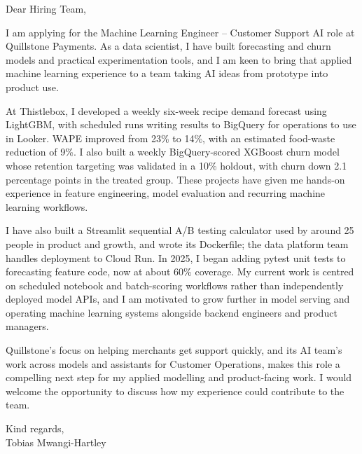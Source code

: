 \documentclass[11pt,a4paper]{article}
\begin{document}
Dear Hiring Team,

I am applying for the Machine Learning Engineer -- Customer Support AI role at Quillstone Payments. As a data scientist, I have built forecasting and churn models and practical experimentation tools, and I am keen to bring that applied machine learning experience to a team taking AI ideas from prototype into product use.

At Thistlebox, I developed a weekly six-week recipe demand forecast using LightGBM, with scheduled runs writing results to BigQuery for operations to use in Looker. WAPE improved from 23\% to 14\%, with an estimated food-waste reduction of 9\%. I also built a weekly BigQuery-scored XGBoost churn model whose retention targeting was validated in a 10\% holdout, with churn down 2.1 percentage points in the treated group. These projects have given me hands-on experience in feature engineering, model evaluation and recurring machine learning workflows.

I have also built a Streamlit sequential A/B testing calculator used by around 25 people in product and growth, and wrote its Dockerfile; the data platform team handles deployment to Cloud Run. In 2025, I began adding pytest unit tests to forecasting feature code, now at about 60\% coverage. My current work is centred on scheduled notebook and batch-scoring workflows rather than independently deployed model APIs, and I am motivated to grow further in model serving and operating machine learning systems alongside backend engineers and product managers.

Quillstone’s focus on helping merchants get support quickly, and its AI team’s work across models and assistants for Customer Operations, makes this role a compelling next step for my applied modelling and product-facing work. I would welcome the opportunity to discuss how my experience could contribute to the team.

Kind regards,\\
Tobias Mwangi-Hartley
\end{document}
